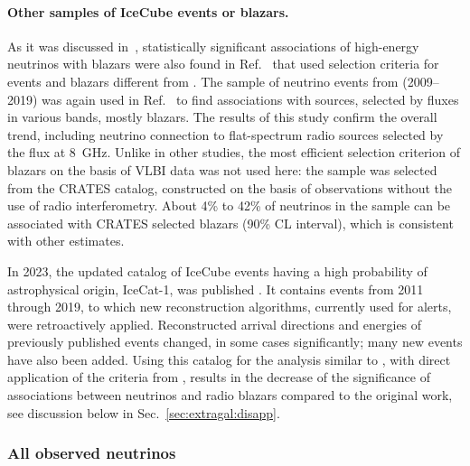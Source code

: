 \documentclass[a4paper,noshowpacs,noshowkeys,floatfix,twocolumn,preprintnumbers,nofootinbib]{revtex4-2}
\begin{document}
\paragraph{Other samples of IceCube events or blazars.}
As it was discussed in~\cite{ST-UFN}, statistically significant associations of high-energy neutrinos with blazars were also found in Ref.~\cite{Resconi:2020} that used selection criteria for events and blazars different from \cite{neutradio1}. The sample of neutrino events from \cite{Resconi:2020} (2009--2019) was again used in Ref.~\cite{Kun:2022} to find associations with sources, selected by fluxes in various bands, mostly blazars. The results of this study confirm the overall trend, including neutrino connection to flat-spectrum radio sources selected by the flux at 8~GHz. Unlike in other studies, the most efficient selection criterion of blazars on the basis of VLBI data was not used here: the sample was selected from the CRATES catalog, constructed on the basis of observations without the use of radio interferometry. About 4\% to 42\% of neutrinos in the sample \cite{Resconi:2020} can be associated with CRATES selected blazars (90\% CL interval), which is consistent with other estimates.

In 2023, the updated catalog of IceCube events having a high probability of astrophysical origin, IceCat-1, was published \cite{IceCat}. It contains events from 2011 through 2019, to which new reconstruction algorithms, currently used for alerts, were retroactively applied. Reconstructed arrival directions and energies of previously published events changed, in some cases significantly; many new events have also been added. Using this catalog for the analysis similar to \cite{neutradio1}, with direct application of the criteria from \cite{neutradio1}, results in the decrease \cite{IceCube:corr-IceCat} of the significance of associations between neutrinos and radio blazars compared to the original work, see discussion below in Sec.~\ref{sec:extragal:disapp}.

\subsubsection{All observed neutrinos}
\label{sec:extragal:blazars:TeV+}
\end{document}

